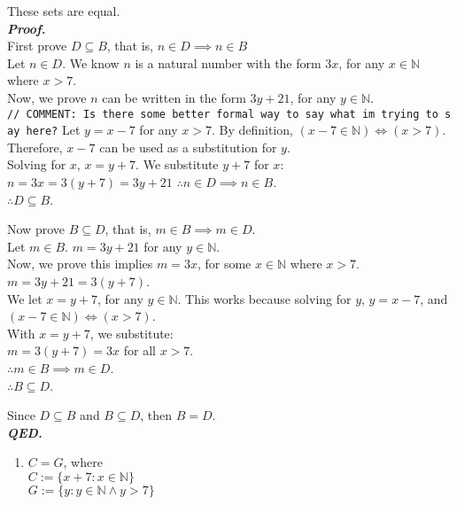 These sets are equal.\\
\textbf{\emph{Proof.}}\\
First prove \(D\subseteq B\), that is, \(n\in D \implies n\in B\)\\
Let \(n\in D\). We know \(n\) is a natural number with the form \(3x\),
for any \(x\in\mathbb{N}\) where \(x>7\).\\
Now, we prove \(n\) can be written in the form \(3y+21\), for any
\(y\in\mathbb{N}\).\\
\texttt{//\ COMMENT:\ Is\ there\ some\ better\ formal\ way\ to\ say\ what\ im\ trying\ to\ say\ here?}
Let \(y=x-7\) for any \(x>7\). By definition,
\((x-7\in \mathbb{N})\iff (x>7)\). Therefore, \(x-7\) can be used as a
substitution for \(y\).\\
Solving for \(x\), \(x=y+7\). We substitute \(y+7\) for \(x\):\\
\(n=3x=3(y+7)=3y+21\) \(\therefore n\in D \implies n\in B\).\\
\(\therefore D\subseteq B\).

Now prove \(B\subseteq D\), that is, \(m\in B \implies m\in D\).\\
Let \(m\in B\). \(m=3y+21\) for any \(y\in\mathbb{N}\).\\
Now, we prove this implies \(m=3x\), for some \(x\in\mathbb{N}\) where
\(x>7\).\\
\(m=3y+21=3(y+7)\).\\
We let \(x=y+7\), for any \(y\in\mathbb{N}\). This works because solving
for \(y\), \(y=x-7\), and \((x-7\in\mathbb{N})\iff (x>7)\).\\
With \(x=y+7\), we substitute:\\
\(m=3(y+7)=3x\) for all \(x>7\).\\
\(\therefore m\in B\implies m\in D\).\\
\(\therefore B \subseteq D\).

Since \(D\subseteq B\) and \(B \subseteq D\), then \(B=D\).\\
\textbf{\emph{QED.}}

\begin{enumerate}
\def\labelenumi{(\roman{enumi})}
\setcounter{enumi}{1}
\tightlist
\item
  \(C = G\), where\\
  \(C := \{x + 7 : x \in \mathbb{N}\}\)\\
  \(G := \{y : y \in \mathbb{N} \land y > 7\}\)
\end{enumerate}

